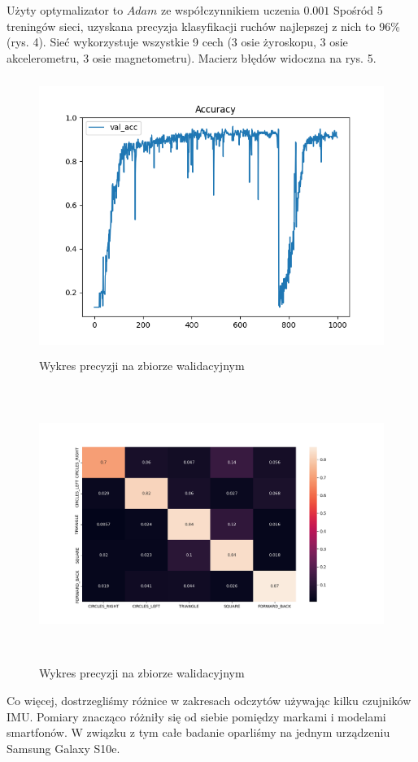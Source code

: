 \documentclass[10pt]{article}
\begin{document}
Użyty optymalizator to $Adam$ ze współczynnikiem uczenia $0.001$
 Spośród 5 treningów sieci, uzyskana precyzja klasyfikacji ruchów najlepszej z nich to 96\% (rys. 4). Sieć wykorzystuje wszystkie 9 cech (3 osie żyroskopu, 3 osie akcelerometru, 3 osie magnetometru). Macierz błędów widoczna na rys. 5.

 \begin{figure}[H]
  \includegraphics[height=9cm]{acc.png}
  \centering
  \caption{Wykres precyzji na zbiorze walidacyjnym}
\end{figure}

\begin{figure}[H]
  \includegraphics[height=9cm]{conf.png}
  \centering
  \caption{Wykres precyzji na zbiorze walidacyjnym}
\end{figure}

Co więcej, dostrzegliśmy różnice w zakresach odczytów używając kilku czujników IMU. Pomiary znacząco różniły się od siebie pomiędzy markami i modelami smartfonów. W związku z tym całe badanie oparliśmy na jednym urządzeniu Samsung Galaxy S10e.
\end{document}
